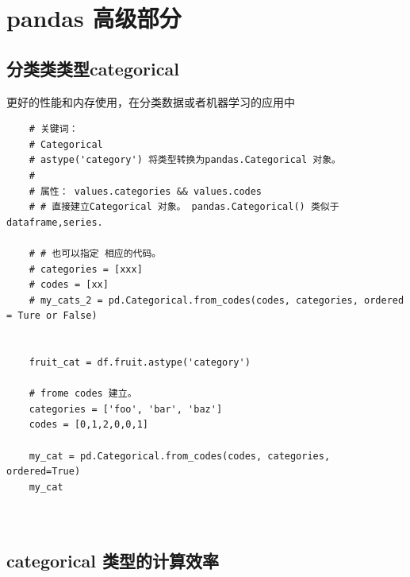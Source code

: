 \documentclass{article}
\begin{document}
\section{pandas 高级部分}

\subsection{分类类类型categorical}
更好的性能和内存使用，在分类数据或者机器学习的应用中

\begin{lstlisting}
	# 关键词： 
	# Categorical
	# astype('category') 将类型转换为pandas.Categorical 对象。
	# 
	# 属性： values.categories && values.codes
	# # 直接建立Categorical 对象。 pandas.Categorical() 类似于 dataframe,series.
	
	# # 也可以指定 相应的代码。
	# categories = [xxx]
	# codes = [xx]
	# my_cats_2 = pd.Categorical.from_codes(codes, categories, ordered = Ture or False)
	
	
	fruit_cat = df.fruit.astype('category')
	
	# frome codes 建立。
	categories = ['foo', 'bar', 'baz']
	codes = [0,1,2,0,0,1]
	
	my_cat = pd.Categorical.from_codes(codes, categories, ordered=True)
	my_cat
	
	
\end{lstlisting}


\subsection{categorical 类型的计算效率}
\end{document}
